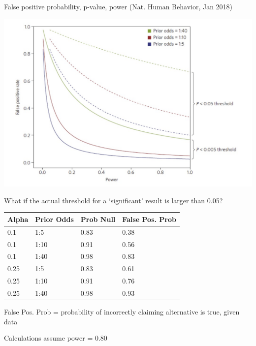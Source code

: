 \documentclass[ignorenonframetext,]{beamer}
\begin{document}
\begin{frame}{%
\protect\hypertarget{false-positive-probability-p-value-power-nat.-human-behavior-jan-2018}{%
False positive probability, p-value, power (Nat. Human Behavior, Jan
2018)}}

\includegraphics[width=1\textwidth,height=\textheight]{ppv_threshold.jpeg}

\end{frame}

\begin{frame}{%
\protect\hypertarget{what-if-the-actual-threshold-for-a-significant-result-is-larger-than-0.05}{%
What if the actual threshold for a ‘significant’ result is larger than
0.05?}}

\begin{longtable}[]{@{}llll@{}}
\toprule
Alpha & Prior Odds & Prob Null & False Pos. Prob\tabularnewline
\midrule
\endhead
0.1 & 1:5 & 0.83 & 0.38\tabularnewline
0.1 & 1:10 & 0.91 & 0.56\tabularnewline
0.1 & 1:40 & 0.98 & 0.83\tabularnewline
0.25 & 1:5 & 0.83 & 0.61\tabularnewline
0.25 & 1:10 & 0.91 & 0.76\tabularnewline
0.25 & 1:40 & 0.98 & 0.93\tabularnewline
\bottomrule
\end{longtable}

False Pos. Prob = probability of incorrectly claiming alternative is
true, given data

Calculations assume power = 0.80

\end{frame}
\end{document}
